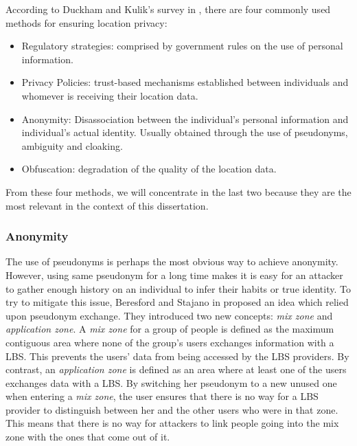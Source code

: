 According to Duckham and Kulik's survey in \cite{duckham2006location},
there are four commonly used methods for ensuring location privacy:
\begin{itemize}
\item Regulatory strategies: comprised by government rules on the use
  of personal information.
\item Privacy Policies: trust-based mechanisms established
  between individuals and whomever is receiving their location data.
\item Anonymity: Disassociation between the individual's personal
  information and individual's actual identity. Usually obtained
  through the use of pseudonyms, ambiguity and cloaking.
\item Obfuscation: degradation of the quality of the location data.
\end{itemize}

From these four methods, we will concentrate in the last two because
they are the most relevant in the context of this dissertation.

\subsubsection{Anonymity}
\label{sec:privacy_anonimity}

The use of pseudonyms is perhaps the most obvious way to achieve
anonymity. However, using same pseudonym for a long time makes it is
easy for an attacker to gather enough history on an individual to
infer their habits or true identity. To try to mitigate this issue,
Beresford and Stajano in \cite{1186725} proposed an idea which relied
upon pseudonym exchange. They introduced two new concepts: \emph{mix
  zone} and \emph{application zone}. A \emph{mix zone} for a group of
people is defined as the maximum contiguous area where none of the
group's users exchanges information with a LBS. This prevents the
users' data from being accessed by the LBS providers. By contrast, an
\emph{application zone} is defined as an area where at least one of
the users exchanges data with a LBS. By switching her pseudonym to a
new unused one when entering a \emph{mix zone}, the user ensures that
there is no way for a LBS provider to distinguish between her and the
other users who were in that zone. This means that there is no way for
attackers to link people going into the mix zone with the ones that
come out of it.


